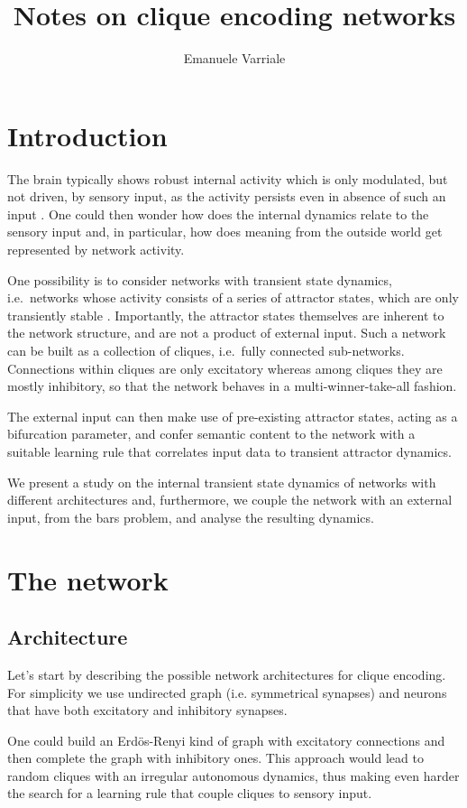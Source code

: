 \documentclass[12pt,a4paper]{article}
\author{Emanuele Varriale}
\title{Notes on clique encoding networks}
\begin{document}
	\maketitle
	\section{Introduction}
		The brain typically shows robust internal activity which is only modulated, but not driven, by sensory input, as the activity persists even in absence of such an input \cite{fiser_small_2004}. One could then wonder how does the internal dynamics relate to the sensory input and, in particular, how does meaning from the outside world get represented by network activity. 
		
		One possibility is to consider networks with transient state dynamics, i.e.\ networks whose activity consists of a series of attractor states, which are only transiently stable \cite{gros_semantic_2010}. Importantly, the attractor states themselves  are inherent to the network structure, and are not a product of external input. Such a network can be built as a collection of cliques, i.e.\ fully connected sub-networks. Connections  within cliques are only excitatory whereas among cliques they are mostly inhibitory, so that the network behaves in a multi-winner-take-all fashion. 
		
		The external input can then make use of pre-existing attractor states, acting as a bifurcation parameter, and confer semantic content to the network with a suitable learning rule that correlates input data to transient attractor dynamics. 
		
		We present a study on the internal transient state dynamics of networks with different architectures and, furthermore, we couple the network with an external input, from the bars problem, and analyse the resulting dynamics.
		
	\section{The network}
	\subsection{Architecture}
		Let's start by describing the possible network architectures for clique encoding. For simplicity we use undirected graph (i.e. symmetrical synapses) and neurons that have both excitatory and inhibitory synapses.
			
		One could build an Erd\"{o}s-Renyi kind of graph with excitatory connections and then complete the graph with inhibitory ones. This approach would lead to random cliques with an irregular autonomous dynamics, thus making even harder the search for a learning rule that couple cliques to sensory input.
			
\end{document}
